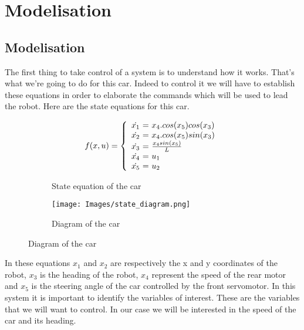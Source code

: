 \section{Modelisation}

\subsection{Modelisation}
The first thing to take control of a system is to understand how it
works. That's what we're going to do for this car. Indeed to control
it we will have to establish these equations in order to elaborate
the commands which will be used to lead the robot. Here are the state
equations for this car.

\begin{figure}[!ht]
    \centering
    \begin{subfigure}[b]{0.45\textwidth}
        \centering
        
            $$ f(x, u) = \left \{
            \begin{array}{c @{=} l}
                \dot{x_1}\ & \ x_4.cos(x_5) cos(x_3) \\
                \dot{x_2}\ & \ x_4.cos(x_5) sin(x_3) \\
                \dot{x_3}\ & \ \frac{x_4 sin(x_5)}{L} \\
                \dot{x_4}\ & \ u_1 \\
                \dot{x_5}\ & \ u_2 
            \end{array}
            \right. $$
        
        \caption{State equation of the car}
        \label{eqn:state}
    \end{subfigure}
    \hfill
    \begin{subfigure}[b]{0.45\textwidth}
        \centering
        \texttt{[image: Images/state\_diagram.png]}
        \caption{Diagram of the car}
        \label{fig:raspi_config}
    \end{subfigure}
\end{figure}



In these equations $x_1$ and $x_2$ are respectively the x and y
coordinates of the robot, $x_3$ is the heading of the robot, $x_4$
represent the speed of the rear motor and $x_5$ is the steering angle
of the car controlled by the front servomotor. In this system it is
important to identify the variables of interest. These are the variables
that we will want to control. In our case we will be interested in the 
speed of the car and its heading. \\

